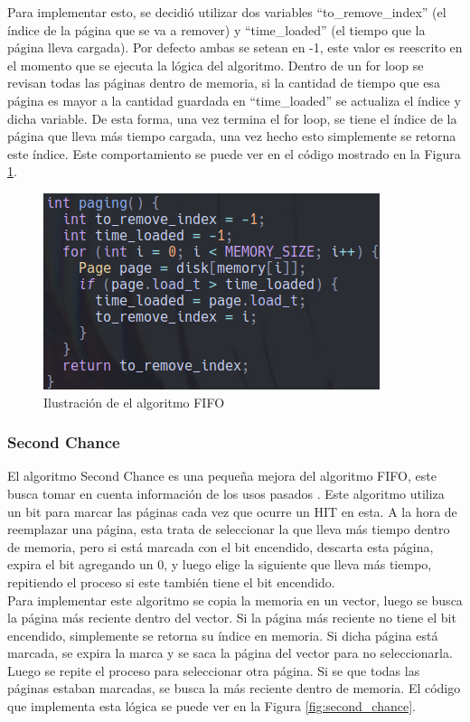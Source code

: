 \documentclass{report}
\begin{document}
Para implementar esto, se decidió utilizar dos variables ``to\_remove\_index'' (el índice de la página que se va a remover) y ``time\_loaded'' (el tiempo que la página lleva cargada). 
Por defecto ambas se setean en -1, este valor es reescrito en el momento que se ejecuta la lógica del algoritmo.
Dentro de un for loop se revisan todas las páginas dentro de memoria, si la cantidad de tiempo que esa página es mayor a la cantidad guardada en ``time\_loaded'' se actualiza el índice y dicha variable.
De esta forma, una vez termina el for loop, se tiene el índice de la página que lleva más tiempo cargada, una vez hecho esto simplemente se retorna este índice.
Este comportamiento se puede ver en el código mostrado en la Figura \ref{fig:fifo}.

\begin{figure}[h]
  \centering
  \includegraphics[width=0.8\linewidth]{figuras/fifo.png}
  \caption{Ilustración de el algoritmo FIFO}
  \label{fig:fifo}
\end{figure}

\subsubsection{Second Chance}
El algoritmo Second Chance es una pequeña mejora del algoritmo FIFO, este busca tomar en cuenta información de los usos pasados \cite{ref1}. 
Este algoritmo utiliza un bit para marcar las páginas cada vez que ocurre un HIT en esta. 
A la hora de reemplazar una página, esta trata de seleccionar la que lleva más tiempo dentro de memoria, pero si está marcada con el bit encendido, descarta esta página, expira el bit agregando un 0, y luego elige la siguiente que lleva más tiempo, repitiendo el proceso si este también tiene el bit encendido. \\

Para implementar este algoritmo se copia la memoria en un vector, luego se busca la página más reciente dentro del vector. 
Si la página más reciente no tiene el bit encendido, simplemente se retorna su índice en memoria. 
Si dicha página está marcada, se expira la marca y se saca la página del vector para no seleccionarla.
Luego se repite el proceso para seleccionar otra página. 
Si se que todas las páginas estaban marcadas, se busca la más reciente dentro de memoria.
El código que implementa esta lógica se puede ver en la Figura \ref{fig:second_chance}.
\end{document}
